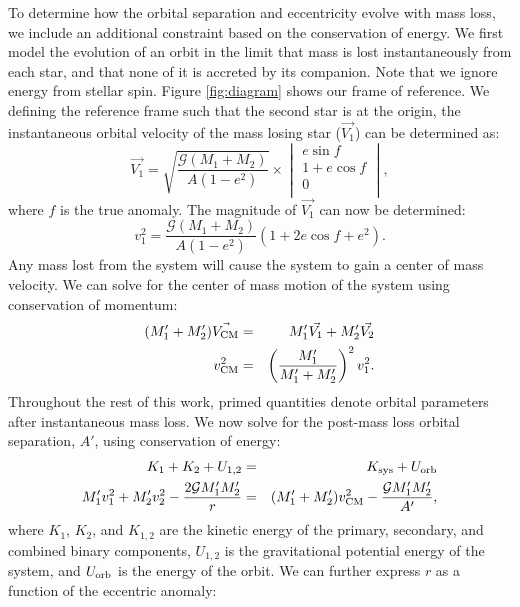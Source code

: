\documentclass{emulateapj}
\begin{document}
To determine how the orbital separation and eccentricity evolve with mass loss, we include an additional constraint based on the conservation of energy. We first model the evolution of an orbit in the limit that mass is lost instantaneously from each star, and that none of it is accreted by its companion. Note that we ignore energy from stellar spin. Figure \ref{fig:diagram} shows our frame of reference. We defining the reference frame such that the second star is at the origin, the instantaneous orbital velocity of the mass losing star ($\vec{V_1}$) can be determined as:
\begin{equation}
\vec{V_1} =   \sqrt{\frac{\mathcal{G} (M_1 + M_2) }{A (1-e^2)}} \times
  \begin{vmatrix}
     e \sin f \\
    1 + e \cos f \\
    0 \\        
  \end{vmatrix} ,
\end{equation}
where $f$ is the true anomaly. The magnitude of $\vec{V_1}$ can now be determined:
\begin{equation}
v_1^2 = \frac{\mathcal{G} (M_1 + M_2) }{A (1-e^2)}(1 + 2 e \cos f + e^2). \label{eq:v_1}
\end{equation}
Any mass lost from the system will cause the system to gain a center of mass velocity. We can solve for the center of mass motion of the system using conservation of momentum:
\begin{eqnarray}
(M_1' + M_2') \vec{V_{\rm CM}} &=& M_1' \vec{V_1} + M_2' \vec{V_2} \label{eq:vcm} \\
v_{\rm CM}^2 &=& \left( \frac{M_1'}{M_1' + M_2'} \right)^2 v_1^2. \label{eq:v1_vcm}
\end{eqnarray}
Throughout the rest of this work, primed quantities denote orbital parameters after instantaneous mass loss. We now solve for the post-mass loss orbital separation, $A'$, using conservation of energy:
\begin{eqnarray}
K_1 + K_2 + U_{1,2} &=& K_{\rm sys} + U_{\rm orb} \nonumber \\
M_1' v_1^2 + M_2' v_2^2 - \frac{2 \mathcal{G} M_1' M_2'}{r} &=& (M_1' + M_2') v_{\rm CM}^2 - \frac{\mathcal{G} M_1' M_2'}{A'},\label{eq:energy_cons}
\end{eqnarray}
where $K_1$, $K_2$, and $K_{1,2}$ are the kinetic energy of the primary, secondary, and combined binary components, $U_{1,2}$ is the gravitational potential energy of the system, and $U_{\rm orb}$ is the energy of the orbit. We can further express $r$ as a function of the eccentric anomaly:
\end{document}
